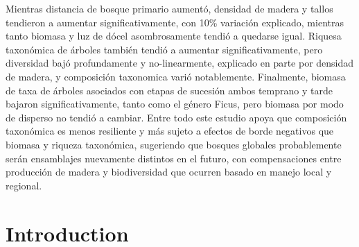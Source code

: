 \documentclass[
  12pt,
]{article}
\begin{document}
Mientras distancia de bosque primario aumentó, densidad de madera y tallos tendieron a aumentar significativamente, con 10\% variación explicado, mientras tanto biomasa y luz de dócel asombrosamente tendió a quedarse igual.
Riquesa taxonómica de árboles también tendió a aumentar significativamente, pero diversidad bajó profundamente y no-linearmente, explicado en parte por densidad de madera, y composición taxonomica varió notablemente.
Finalmente, biomasa de taxa de árboles asociados con etapas de sucesión ambos temprano y tarde bajaron significativamente, tanto como el género Ficus, pero biomasa por modo de disperso no tendió a cambiar.
Entre todo este estudio apoya que composición taxonómica es menos resiliente y más sujeto a efectos de borde negativos que biomasa y riqueza taxonómica, sugeriendo que bosques globales probablemente serán ensamblajes nuevamente distintos en el futuro, con compensaciones entre producción de madera y biodiversidad que ocurren basado en manejo local y regional.

\newpage

\hypertarget{introduction}{%
\section{Introduction}\label{introduction}}
\end{document}
